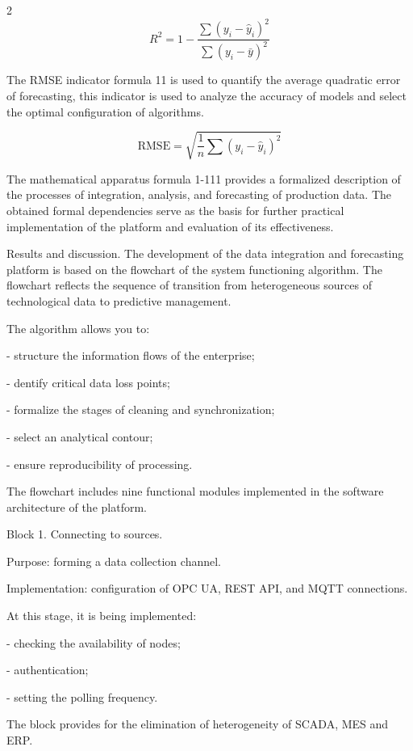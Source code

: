\begin{multicols}{2}
\begin{equation}
R^{2} = 1 - \frac{\sum (y_{i} - \hat{y}_{i})^{2}}{\sum (y_{i} - \bar{y})^{2}}
\end{equation}

The RMSE indicator formula 11 is used to quantify the average quadratic
error of forecasting, this indicator is used to analyze the accuracy of
models and select the optimal configuration of algorithms.

\begin{equation}
\text{RMSE} = \sqrt{\frac{1}{n} \sum (y_{i} - \hat{y}_{i})^{2}}
\end{equation}

The mathematical apparatus formula 1-111 provides a formalized
description of the processes of integration, analysis, and forecasting
of production data. The obtained formal dependencies serve as the basis
for further practical implementation of the platform and evaluation of
its effectiveness.

Results and discussion. The development of the data integration and
forecasting platform is based on the flowchart of the system functioning
algorithm. The flowchart reflects the sequence of transition from
heterogeneous sources of technological data to predictive management.

The algorithm allows you to:

- structure the information flows of the enterprise;

- dentify critical data loss points;

- formalize the stages of cleaning and synchronization;

- select an analytical contour;

- ensure reproducibility of processing.

The flowchart includes nine functional modules implemented in the
software architecture of the platform.

Block 1. Connecting to sources.

Purpose: forming a data collection channel.

Implementation: configuration of OPC UA, REST API, and MQTT connections.

At this stage, it is being implemented:

- checking the availability of nodes;

- authentication;

- setting the polling frequency.

The block provides for the elimination of heterogeneity of SCADA, MES
and ERP.


\end{multicols}
